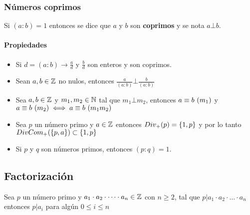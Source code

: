 \subsubsection{Números coprimos}
Si $(a:b) = 1$ entonces se dice que $a$ y $b$ son \textbf{coprimos} y se nota $a\bot b$.

\paragraph{Propiedades}
\begin{itemize}
\item Si $d=(a:b)\to \frac{a}{d}$ y $\frac{b}{d}$ son enteros y son coprimos.
\item Sean $a,b\in\mathbb{Z}$ no nulos, entonces $\frac{a}{(a:b)}\bot\frac{b}{(a:b)}$
\item Sea $a,b\in\mathbb{Z}$ y $m_1,m_2\in\mathbb{N}$ tal que $m_1\bot m_2$, entonces $a \equiv b ~(m_1)$ y \newline $a \equiv b ~(m_2) \iff a \equiv b ~(m_1m_2)$
\item Sea $p$ un número primo y $a\in\mathbb{Z}$ entonces $Div_{+}(p) = \{1,p\}$ y por lo tanto \newline $DivCom_{+}(\{p,a\})\subset\{1,p\}$
\item Si $p$ y $q$ son números primos, entonces $(p:q) = 1$.
\end{itemize}

\subsection{Factorización}
Sea $p$ un número primo y $a_1\cdot a_2\cdot\dots\cdot a_n  \in\mathbb{Z}$ con $n\geq 2$, tal que $p|a_1\cdot a_2\cdot\dots\cdot a_n$ entonces $p|a_i$ para algún $0\leq i \leq n$ 

